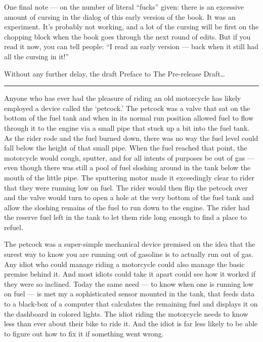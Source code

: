 \documentclass[
]{scrbook}
\begin{document}
One final note --- on the number of literal ``fucks'' given: there is an
excessive amount of cursing in the dialog of this early version of the
book. It was an experiment. It's probably not working, and a lot of the
cursing will be first on the chopping block when the book goes through
the next round of edits. But if you read it now, you can tell people:
``I read an early version --- back when it still had all the cursing in
it!''

Without any further delay, the draft Preface to The Pre-release
Draft\ldots{}

\begin{center}\rule{0.5\linewidth}{0.5pt}\end{center}

Anyone who has ever had the pleasure of riding an old motorcycle has
likely employed a device called the `petcock.' The petcock was a valve
that sat on the bottom of the fuel tank and when in its normal run
position allowed fuel to flow through it to the engine via a small pipe
that stuck up a bit into the fuel tank. As the rider rode and the fuel
burned down, there was no way the fuel level could fall below the height
of that small pipe. When the fuel reached that point, the motorcycle
would cough, sputter, and for all intents of purposes be out of gas ---
even though there was still a pool of fuel sloshing around in the tank
below the mouth of the little pipe. The sputtering motor made it
exceedingly clear to rider that they were running low on fuel. The rider
would then flip the petcock over and the valve would turn to open a hole
at the very bottom of the fuel tank and allow the sloshing remains of
the fuel to run down to the engine. The rider had the reserve fuel left
in the tank to let them ride long enough to find a place to refuel.

The petcock was a super-simple mechanical device premised on the idea
that the surest way to know you are running out of gasoline is to
actually run out of gas. Any idiot who could manage riding a motorcycle
could also manage the basic premise behind it. And most idiots could
take it apart could see how it worked if they were so inclined. Today
the same need --- to know when one is running low on fuel --- is met my
a sophisticated sensor mounted in the tank, that feeds data to a
black-box of a computer that calculates the remaining fuel and displays
it on the dashboard in colored lights. The idiot riding the motorcycle
needs to know less than ever about their bike to ride it. And the idiot
is far less likely to be able to figure out how to fix it if something
went wrong.
\end{document}
